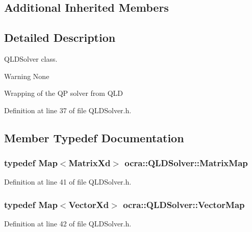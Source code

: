 \subsection*{Additional Inherited Members}


\subsection{Detailed Description}
Q\+L\+D\+Solver class. 

\begin{DoxyWarning}{Warning}
None
\end{DoxyWarning}
Wrapping of the QP solver from Q\+LD 

Definition at line 37 of file Q\+L\+D\+Solver.\+h.



\subsection{Member Typedef Documentation}
\subsubsection[{\texorpdfstring{Matrix\+Map}{MatrixMap}}]{\setlength{\rightskip}{0pt plus 5cm}typedef Map$<$Matrix\+Xd$>$ {\bf ocra\+::\+Q\+L\+D\+Solver\+::\+Matrix\+Map}}\hypertarget{classocra_1_1QLDSolver_aebfc53b837336b9942a8ed2e6ca6c0e2}{}\label{classocra_1_1QLDSolver_aebfc53b837336b9942a8ed2e6ca6c0e2}


Definition at line 41 of file Q\+L\+D\+Solver.\+h.

\subsubsection[{\texorpdfstring{Vector\+Map}{VectorMap}}]{\setlength{\rightskip}{0pt plus 5cm}typedef Map$<$Vector\+Xd$>$ {\bf ocra\+::\+Q\+L\+D\+Solver\+::\+Vector\+Map}}\hypertarget{classocra_1_1QLDSolver_a0f7e278b557ca2b7fad6d059ee87a707}{}\label{classocra_1_1QLDSolver_a0f7e278b557ca2b7fad6d059ee87a707}


Definition at line 42 of file Q\+L\+D\+Solver.\+h.




